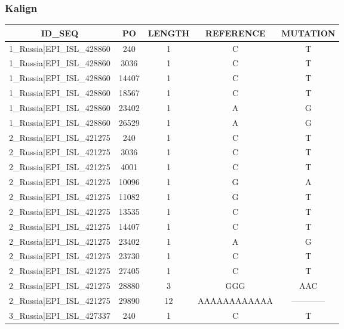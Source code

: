 \documentclass[a4paper,10pt]{article}
\begin{document}
\newpage
\subsubsection{Kalign}

\begin{longtable}{@{}ccccc@{}}
\toprule
\textbf{ID\_SEQ} & \textbf{PO} & \textbf{LENGTH} & \textbf{REFERENCE} & \textbf{MUTATION} \\* \midrule
\endfirsthead
%
\cline{1-5}
\endhead
%
1\_Russia|EPI\_ISL\_428860 & 240 & 1 & C & T \\* \midrule
1\_Russia|EPI\_ISL\_428860 & 3036 & 1 & C & T \\* \midrule
1\_Russia|EPI\_ISL\_428860 & 14407 & 1 & C & T \\* \midrule
1\_Russia|EPI\_ISL\_428860 & 18567 & 1 & C & T \\* \midrule
1\_Russia|EPI\_ISL\_428860 & 23402 & 1 & A & G \\* \midrule
1\_Russia|EPI\_ISL\_428860 & 26529 & 1 & A & G \\* \midrule
2\_Russia|EPI\_ISL\_421275 & 240 & 1 & C & T \\* \midrule
2\_Russia|EPI\_ISL\_421275 & 3036 & 1 & C & T \\* \midrule
2\_Russia|EPI\_ISL\_421275 & 4001 & 1 & C & T \\* \midrule
2\_Russia|EPI\_ISL\_421275 & 10096 & 1 & G & A \\* \midrule
2\_Russia|EPI\_ISL\_421275 & 11082 & 1 & G & T \\* \midrule
2\_Russia|EPI\_ISL\_421275 & 13535 & 1 & C & T \\* \midrule
2\_Russia|EPI\_ISL\_421275 & 14407 & 1 & C & T \\* \midrule
2\_Russia|EPI\_ISL\_421275 & 23402 & 1 & A & G \\* \midrule
2\_Russia|EPI\_ISL\_421275 & 23730 & 1 & C & T \\* \midrule
2\_Russia|EPI\_ISL\_421275 & 27405 & 1 & C & T \\* \midrule
2\_Russia|EPI\_ISL\_421275 & 28880 & 3 & GGG & AAC \\* \midrule
2\_Russia|EPI\_ISL\_421275 & 29890 & 12 & AAAAAAAAAAAA & ------------ \\* \midrule
3\_Russia|EPI\_ISL\_427337 & 240 & 1 & C & T \\* \midrule

\end{longtable}
\end{document}
